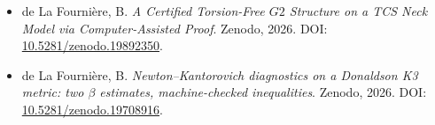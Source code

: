 \documentclass[11pt,a4paper]{article}
\newcommand{\Gtwo}{\mathrm{G}_2}
\def\Gtwo{G2}%
\begin{document}
\begin{itemize}
\item[{[A]}] de La Fourni\`ere, B. \emph{A Certified Torsion-Free $\Gtwo$ Structure on a TCS Neck Model via Computer-Assisted Proof}. Zenodo, 2026. DOI: \href{https://doi.org/10.5281/zenodo.19892350}{10.5281/zenodo.19892350}.
\item[{[C]}] de La Fourni\`ere, B. \emph{Newton--Kantorovich diagnostics on a Donaldson K3 metric: two $\beta$ estimates, machine-checked inequalities}. Zenodo, 2026. DOI: \href{https://doi.org/10.5281/zenodo.19708916}{10.5281/zenodo.19708916}.
\end{itemize}



\end{document}
